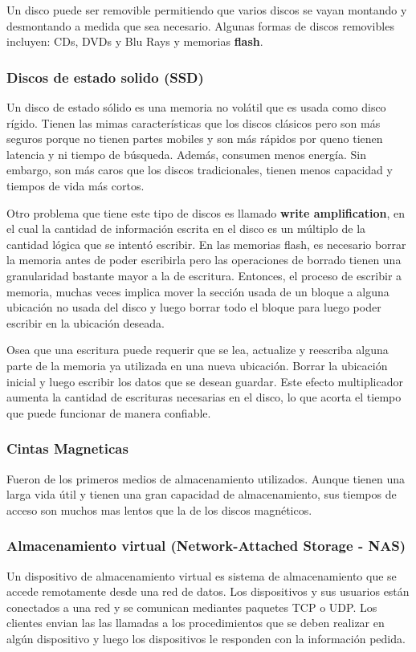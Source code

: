 Un disco puede ser removible permitiendo que varios discos se vayan montando y desmontando a medida que sea necesario. Algunas formas de discos removibles incluyen: CDs, DVDs y Blu Rays y memorias \textbf{flash}.

\subsubsection{Discos de estado solido (SSD)}
Un disco de estado sólido es una memoria no volátil que es usada como disco rígido. Tienen las mimas características que los discos clásicos pero son más seguros porque no tienen partes mobiles y son más rápidos por queno tienen latencia y ni tiempo de búsqueda. Además, consumen menos energía. Sin embargo, son más caros que los discos tradicionales, tienen menos capacidad y tiempos de vida más cortos.

Otro problema que tiene este tipo de discos es llamado \textbf{write amplification}, en el cual la cantidad de información escrita en el disco es un múltiplo de la cantidad lógica que se intentó escribir. En las memorias flash, es necesario borrar la memoria antes de poder escribirla pero las operaciones de borrado tienen una granularidad bastante mayor a la de escritura. Entonces, el proceso de escribir a memoria, muchas veces implica mover la sección usada de un bloque a alguna ubicación no usada del disco y luego borrar todo el bloque para luego poder escribir en la ubicación deseada.

Osea que una escritura puede requerir que se lea, actualize y reescriba alguna parte de la memoria ya utilizada en una nueva ubicación. Borrar la ubicación inicial y luego escribir los datos que se desean guardar. Este efecto multiplicador aumenta la cantidad de escrituras necesarias en el disco, lo que acorta el tiempo que puede funcionar de manera confiable.

\subsubsection{Cintas Magneticas}
Fueron de los primeros medios de almacenamiento utilizados. Aunque tienen una larga vida útil y tienen una gran capacidad de almacenamiento, sus tiempos de acceso son muchos mas lentos que la de los discos magnéticos.

\subsubsection{Almacenamiento virtual (Network-Attached Storage - NAS)}
Un dispositivo de almacenamiento virtual es sistema de almacenamiento que se accede remotamente desde una red de datos. Los dispositivos y sus usuarios están conectados a una red y se comunican mediantes paquetes TCP o UDP. Los clientes envian las las llamadas a los procedimientos que se deben realizar en algún dispositivo y luego los dispositivos le responden con la información pedida.

